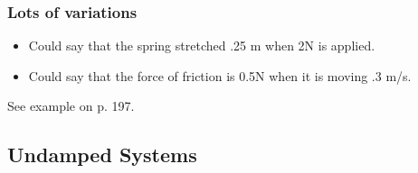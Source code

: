 \begin{frame}
  \frametitle{Lots of variations}

  \begin{itemize}
  \item Could say that the spring stretched .25 m when 2N is applied.
  \item Could say that the force of friction is 0.5N when it is moving
    .3 m/s. 
  \end{itemize}

  See example on p. 197.

\end{frame}

\subsection{Undamped Systems}

